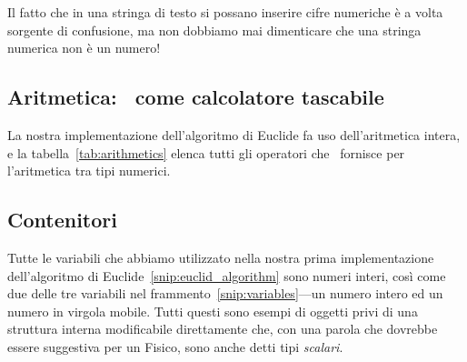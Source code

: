
Il fatto che in una stringa di testo si possano inserire cifre numeriche \`e a
volta sorgente di confusione, ma non dobbiamo mai dimenticare che una stringa
numerica non \`e un numero!


\subsection{Aritmetica: \python\ come calcolatore tascabile}

La nostra implementazione dell'algoritmo di Euclide fa uso dell'aritmetica intera,
e la tabella~\ref{tab:arithmetics} elenca tutti gli operatori che \python\
fornisce per l'aritmetica tra tipi numerici.

\begin{table}[!htbp]
\end{table}



\subsection{Contenitori}

Tutte le variabili che abbiamo utilizzato nella nostra prima implementazione dell'algoritmo
di Euclide~\ref{snip:euclid_algorithm} sono numeri interi, cos\`i come due delle
tre variabili nel frammento~\ref{snip:variables}---un numero intero ed un numero
in virgola mobile. Tutti questi sono esempi di oggetti privi di una struttura interna
modificabile direttamente che, con una parola che dovrebbe essere suggestiva per un Fisico,
sono anche detti tipi \emph{scalari}.

